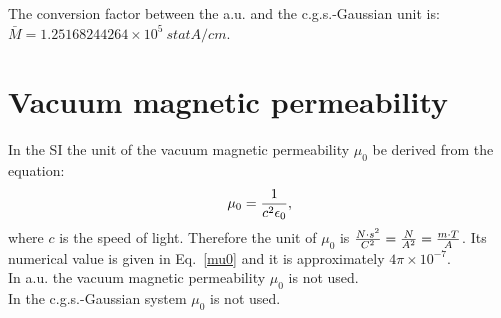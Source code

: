 \documentclass[12pt,a4paper]{article}
\def\barmagcgs{1.25168244264\times 10^{5}}
\begin{document}
{\color{green} The conversion factor between the a.u. and the 
c.g.s.-Gaussian unit is:
$\bar M = \barmagcgs\ statA/cm$.
}


\newpage
\section{\color{coral}Vacuum magnetic permeability}
In the SI the unit of the vacuum magnetic permeability $\mu_0$
be derived from the equation: 
\begin{equation}
\mu_0={1\over c^2 \epsilon_0},
\end{equation}
where $c$ is the speed of light. Therefore the unit of $\mu_0$ is 
${N\cdot s^2 \over C^2}={N \over A^2}={m\cdot T \over A}$. Its numerical
value is given in Eq.~\ref{mu0} and it is approximately $4\pi\times 10^{-7}$.
\\

{\color{web-blue} In a.u. the vacuum magnetic permeability $\mu_0$ is not 
used.}
\\

{\color{orange} In the c.g.s.-Gaussian system $\mu_0$ is not used.
}
\\


\newpage
\end{document}
